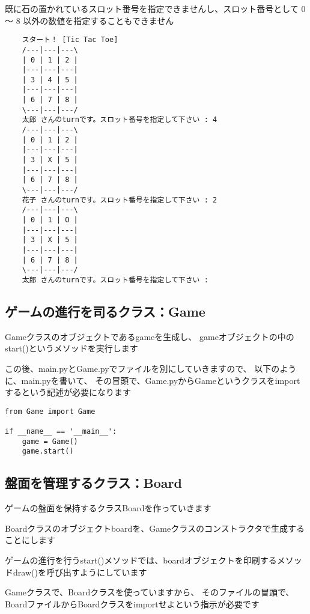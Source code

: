 \documentclass[uplatex,a4paper,11pt,oneside,openany]{jsbook}
\begin{document}
既に石の置かれているスロット番号を指定できませんし、スロット番号として 0 〜 8 以外の数値を指定することもできません

\begin{spacing}{0.74}
  \begin{verbatim}
    スタート！ [Tic Tac Toe]
    /---|---|---\
    | 0 | 1 | 2 |
    |---|---|---|
    | 3 | 4 | 5 |
    |---|---|---|
    | 6 | 7 | 8 |
    \---|---|---/
    太郎 さんのturnです。スロット番号を指定して下さい : 4
    /---|---|---\
    | 0 | 1 | 2 |
    |---|---|---|
    | 3 | X | 5 |
    |---|---|---|
    | 6 | 7 | 8 |
    \---|---|---/
    花子 さんのturnです。スロット番号を指定して下さい : 2
    /---|---|---\
    | 0 | 1 | O |
    |---|---|---|
    | 3 | X | 5 |
    |---|---|---|
    | 6 | 7 | 8 |
    \---|---|---/
    太郎 さんのturnです。スロット番号を指定して下さい :
  \end{verbatim}
\end{spacing}

\subsection{ゲームの進行を司るクラス：Game}

Gameクラスのオブジェクトであるgameを生成し、
gameオブジェクトの中のstart()というメソッドを実行します

この後、main.pyとGame.pyでファイルを別にしていきますので、
以下のように、main.pyを書いて、
その冒頭で、Game.pyからGameというクラスをimportするという記述が必要になります

\begin{lstlisting}[caption=main.py,label=prog01-3-1]
from Game import Game

if __name__ == '__main__':
    game = Game()
    game.start()
\end{lstlisting}%

\subsection{盤面を管理するクラス：Board}

ゲームの盤面を保持するクラスBoardを作っていきます

Boardクラスのオブジェクトboardを、Gameクラスのコンストラクタで生成することにします

ゲームの進行を行うstart()メソッドでは、boardオブジェクトを印刷するメソッドdraw()を呼び出すようにしています

Gameクラスで、Boardクラスを使っていますから、
そのファイルの冒頭で、BoardファイルからBoardクラスをimportせよという指示が必要です
\end{document}

